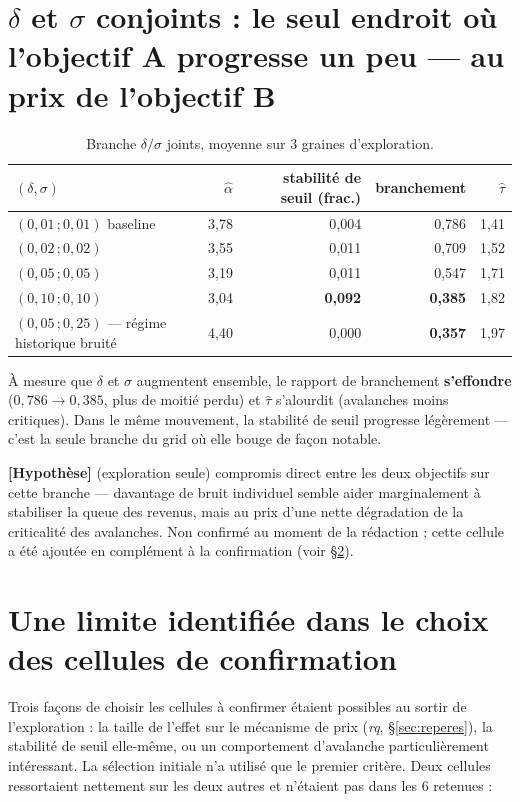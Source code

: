 \documentclass[11pt,a4paper]{article}
\newcommand{\hyp}{\textbf{[Hypothèse]}}
\begin{document}
\section{$\delta$ et $\sigma$ conjoints : le seul endroit où l'objectif
A progresse un peu --- au prix de l'objectif B}
\label{sec:deltasigma}

\begin{table}[h]
\centering
\begin{tabular}{@{}lrrrr@{}}
\toprule
$(\delta,\sigma)$ & $\hat\alpha$ & stabilité de seuil (frac.) & branchement & $\hat\tau$ \\
\midrule
$(0{,}01\,;0{,}01)$ baseline & 3{,}78 & 0{,}004 & 0{,}786 & 1{,}41 \\
$(0{,}02\,;0{,}02)$ & 3{,}55 & 0{,}011 & 0{,}709 & 1{,}52 \\
$(0{,}05\,;0{,}05)$ & 3{,}19 & 0{,}011 & 0{,}547 & 1{,}71 \\
$(0{,}10\,;0{,}10)$ & 3{,}04 & \textbf{0{,}092} & \textbf{0{,}385} & 1{,}82 \\
$(0{,}05\,;0{,}25)$ --- régime historique bruité & 4{,}40 & 0{,}000 & \textbf{0{,}357} & 1{,}97 \\
\bottomrule
\end{tabular}
\caption{Branche $\delta/\sigma$ joints, moyenne sur 3 graines
d'exploration.}
\end{table}

À mesure que $\delta$ et $\sigma$ augmentent ensemble, le rapport de
branchement \textbf{s'effondre} ($0{,}786 \to 0{,}385$, plus de moitié
perdu) et $\hat\tau$ s'alourdit (avalanches moins critiques). Dans le
même mouvement, la stabilité de seuil progresse légèrement --- c'est la
seule branche du grid où elle bouge de façon notable.

\hyp{} (exploration seule) compromis direct entre les deux objectifs
sur cette branche --- davantage de bruit individuel semble aider
marginalement à stabiliser la queue des revenus, mais au prix d'une
nette dégradation de la criticalité des avalanches. Non confirmé au
moment de la rédaction ; cette cellule a été ajoutée en complément à la
confirmation (voir \S\ref{sec:limite}).

\section{Une limite identifiée dans le choix des cellules de
confirmation}
\label{sec:limite}

Trois façons de choisir les cellules à confirmer étaient possibles au
sortir de l'exploration : la taille de l'effet sur le mécanisme de prix
(\emph{rq}, \S\ref{sec:reperes}), la stabilité de seuil elle-même, ou
un comportement d'avalanche particulièrement intéressant. La sélection
initiale n'a utilisé que le premier critère. Deux cellules ressortaient
nettement sur les deux autres et n'étaient pas dans les 6 retenues :
\end{document}
